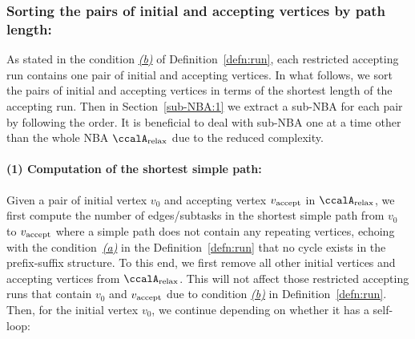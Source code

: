 \documentclass[Afour,sageh,times]{sagej}
\newcounter{mycounter}
\newcommand{\auto}[1]{\ccalA_{\textup{#1}}}
\newcommand{\vertex}[1]{v_{\textup{#1}}}
\begin{document}
{%

  \subsubsection{Sorting the pairs of initial and accepting vertices by path length:}\label{sec:sort}  As stated in the condition \hyperref[cond:b]{\it (b)} of Definition~\ref{defn:run}, each restricted accepting run  contains  one pair of initial and accepting vertices. In what follows, we sort the pairs of initial and accepting vertices in terms of the shortest length of the accepting run.  Then in Section~\ref{sub-NBA:1} we extract a sub-NBA for each pair by following the order. It is beneficial to deal with sub-NBA one at a time other than the whole NBA $\auto{relax}$ due to the reduced complexity.
  \paragraph{(1) Computation of the shortest simple path:} Given a pair of initial vertex $v_0$ and accepting vertex $\vertex{accept}$ in $\auto{relax}$, we first compute the number of edges/subtasks in the shortest simple path from  $v_0$ to $\vertex{accept}$ where a simple path does not contain any  repeating vertices, echoing with the condition~\hyperref[cond:a]{\it (a)} in the Definition~\ref{defn:run} that no cycle exists in the prefix-suffix structure.
  To this end, we first remove all other initial vertices and accepting vertices from $\auto{relax}$. This will not affect those restricted  accepting runs that contain $v_0$ and $\vertex{accept}$ due to condition \hyperref[cond:b]{\it (b)}  in Definition~\ref{defn:run}.  Then, for the initial vertex $v_0$, we continue depending on whether it has a self-loop:
}
\end{document}
